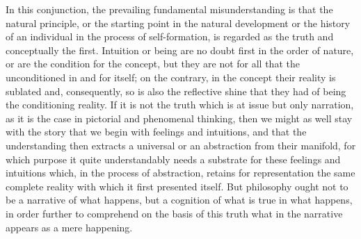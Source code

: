 In this conjunction, the prevailing fundamental
misunderstanding is that the natural principle,
or the starting point in the natural development
or the history of an individual in the process of self-formation,
is regarded as the truth and conceptually the first.
Intuition or being are no doubt first in the order of nature,
or are the condition for the concept,
but they are not for all that the unconditioned in and for itself;
on the contrary, in the concept their reality is sublated
and, consequently, so is also the reflective shine
that they had of being the conditioning reality.
If it is not the truth which is at issue but only narration,
as it is the case in pictorial and phenomenal thinking,
then we might as well stay with the story
that we begin with feelings and intuitions,
and that the understanding then extracts a universal
or an abstraction from their manifold,
for which purpose it quite understandably needs
a substrate for these feelings and intuitions
which, in the process of abstraction, retains
for representation the same complete reality
with which it first presented itself.
But philosophy ought not to be a narrative of what happens,
but a cognition of what is true in what happens,
in order further to comprehend on the basis of this truth
what in the narrative appears as a mere happening.

